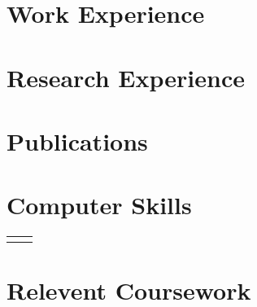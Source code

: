 \documentclass[10pt]{article} %
\begin{document}
\begin{paracol}{2}



\medskip
\section{Work Experience}






\medskip
\section{Research Experience}



%


\switchcolumn
\medskip
\section{Publications}



\medskip
\section{Computer Skills} 

\begin{supertabular}{rl}
	
	

	
\end{supertabular}


\medskip
\section{Relevent Coursework}


\end{paracol}
\end{document}
